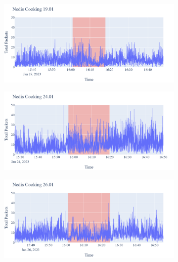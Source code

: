 \begin{figure}[H]
\begin{subfigure}[b]{0.47\textwidth}
    \end{subfigure}
    \begin{subfigure}[b]{0.47\textwidth}
        \centering
        \includegraphics[width=1.2\hsize]{figures/Nedis_Cooking_Packets_19.01.png}
    \end{subfigure}
    \begin{subfigure}[b]{0.47\textwidth}
        \centering
        \includegraphics[width=1.2\hsize]{figures/Nedis_Cooking_Packets_24.01.png}
    \end{subfigure}
    \begin{subfigure}[b]{0.47\textwidth}
        \centering
        \includegraphics[width=1.2\hsize]{figures/Nedis_Cooking_Packets_26.01.png}
    \end{subfigure}

\end{figure}
